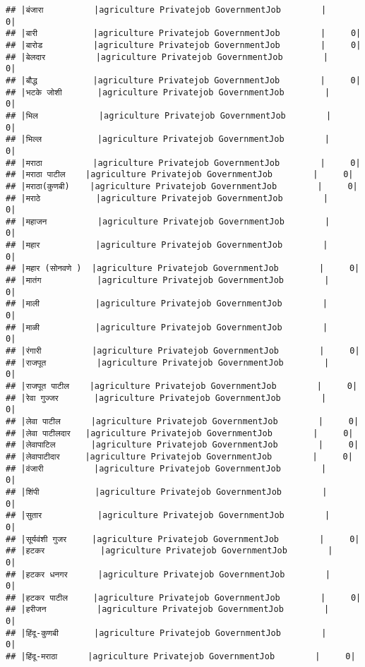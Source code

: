 \documentclass[
]{article}
\begin{document}
\begin{verbatim}
## |बंजारा          |agriculture Privatejob GovernmentJob        |     0|
## |बारी           |agriculture Privatejob GovernmentJob        |     0|
## |बारोड          |agriculture Privatejob GovernmentJob        |     0|
## |बेलदार          |agriculture Privatejob GovernmentJob        |     0|
## |बौद्ध           |agriculture Privatejob GovernmentJob        |     0|
## |भटके जोशी       |agriculture Privatejob GovernmentJob        |     0|
## |भिल            |agriculture Privatejob GovernmentJob        |     0|
## |भिल्ल           |agriculture Privatejob GovernmentJob        |     0|
## |मराठा          |agriculture Privatejob GovernmentJob        |     0|
## |मराठा पाटील    |agriculture Privatejob GovernmentJob        |     0|
## |मराठा(कुणबी)    |agriculture Privatejob GovernmentJob        |     0|
## |मराठे           |agriculture Privatejob GovernmentJob        |     0|
## |महाजन          |agriculture Privatejob GovernmentJob        |     0|
## |महार           |agriculture Privatejob GovernmentJob        |     0|
## |महार (सोनवणे )  |agriculture Privatejob GovernmentJob        |     0|
## |मातंग           |agriculture Privatejob GovernmentJob        |     0|
## |माली           |agriculture Privatejob GovernmentJob        |     0|
## |माळी           |agriculture Privatejob GovernmentJob        |     0|
## |रंगारी          |agriculture Privatejob GovernmentJob        |     0|
## |राजपूत          |agriculture Privatejob GovernmentJob        |     0|
## |राजपूत पाटील    |agriculture Privatejob GovernmentJob        |     0|
## |रेवा गुज्जर       |agriculture Privatejob GovernmentJob        |     0|
## |लेवा पाटील      |agriculture Privatejob GovernmentJob        |     0|
## |लेवा पाटीलदार   |agriculture Privatejob GovernmentJob        |     0|
## |लेवापाटिल       |agriculture Privatejob GovernmentJob        |     0|
## |लेवापाटीदार     |agriculture Privatejob GovernmentJob        |     0|
## |वंजारी          |agriculture Privatejob GovernmentJob        |     0|
## |शिंपी           |agriculture Privatejob GovernmentJob        |     0|
## |सुतार           |agriculture Privatejob GovernmentJob        |     0|
## |सूर्यवंशी गुजर     |agriculture Privatejob GovernmentJob        |     0|
## |हटकर           |agriculture Privatejob GovernmentJob        |     0|
## |हटकर धनगर      |agriculture Privatejob GovernmentJob        |     0|
## |हटकर पाटील     |agriculture Privatejob GovernmentJob        |     0|
## |हरीजन          |agriculture Privatejob GovernmentJob        |     0|
## |हिंदू-कुणबी       |agriculture Privatejob GovernmentJob        |     0|
## |हिंदू-मराठा      |agriculture Privatejob GovernmentJob        |     0|

\end{verbatim}
\end{document}
